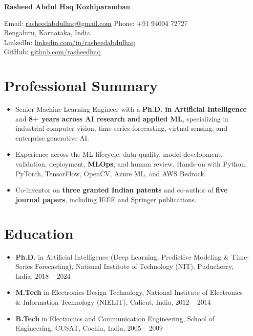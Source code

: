 \documentclass[a4paper,10pt]{article}
\begin{document}
	\pagestyle{empty}
	
	\begin{center}
		{\Huge\bfseries Rasheed Abdul Haq Kozhiparamban}
	\end{center}
	
	\vspace{-2ex}
	
	\begin{center}
		Email: \href{mailto:rasheedabdulhaq@gmail.com}{rasheedabdulhaq@gmail.com} \quad Phone: +91 94004 72727 \\
Bengaluru, Karnataka, India \\
LinkedIn: \href{https://www.linkedin.com/in/rasheedabdulhaq}{linkedin.com/in/rasheedabdulhaq} \\
GitHub: \href{https://github.com/rasheedhaq}{github.com/rasheedhaq}
	\end{center}
	



\section{Professional Summary}
\begin{itemize}[left=0pt]
\item Senior Machine Learning Engineer with a \textbf{Ph.D. in Artificial Intelligence} and \textbf{8+ years across AI research and applied ML}, specializing in industrial computer vision, time-series forecasting, virtual sensing, and enterprise generative AI.

\item Experience across the ML lifecycle: data quality, model development, validation, deployment, \textbf{MLOps}, and human review. Hands-on with Python, PyTorch, TensorFlow, OpenCV, Azure ML, and AWS Bedrock.

\item Co-inventor on \textbf{three granted Indian patents} and co-author of \textbf{five journal papers}, including IEEE and Springer publications.
\end{itemize}
	
	\section{Education}
	\begin{itemize}
		\item \textbf{Ph.D.} in Artificial Intelligence (Deep Learning, Predictive Modeling \& Time-Series Forecasting), National Institute of Technology (NIT), Puducherry, India, 2018 -- 2024
		\item \textbf{M.Tech} in Electronics Design Technology, National Institute of Electronics \& Information Technology (NIELIT), Calicut, India, 2012 -- 2014
		\item \textbf{B.Tech} in Electronics and Communication Engineering, School of Engineering, CUSAT, Cochin, India, 2005 -- 2009
	\end{itemize}
	
\end{document}
